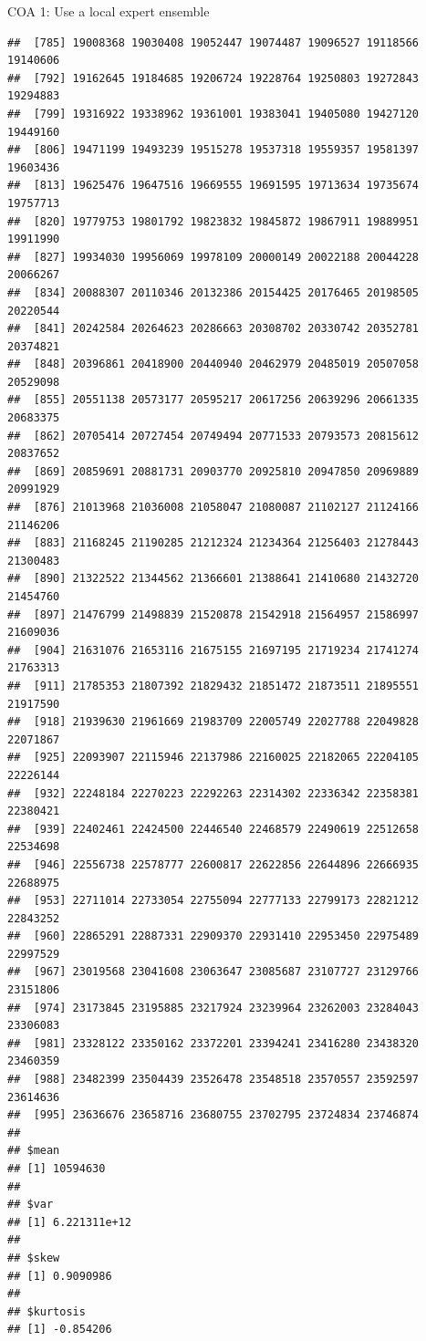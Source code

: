\documentclass[ignorenonframetext,]{beamer}
\begin{document}
\begin{frame}[fragile]{COA 1: Use a local expert ensemble}
\begin{verbatim}
##  [785] 19008368 19030408 19052447 19074487 19096527 19118566 19140606
##  [792] 19162645 19184685 19206724 19228764 19250803 19272843 19294883
##  [799] 19316922 19338962 19361001 19383041 19405080 19427120 19449160
##  [806] 19471199 19493239 19515278 19537318 19559357 19581397 19603436
##  [813] 19625476 19647516 19669555 19691595 19713634 19735674 19757713
##  [820] 19779753 19801792 19823832 19845872 19867911 19889951 19911990
##  [827] 19934030 19956069 19978109 20000149 20022188 20044228 20066267
##  [834] 20088307 20110346 20132386 20154425 20176465 20198505 20220544
##  [841] 20242584 20264623 20286663 20308702 20330742 20352781 20374821
##  [848] 20396861 20418900 20440940 20462979 20485019 20507058 20529098
##  [855] 20551138 20573177 20595217 20617256 20639296 20661335 20683375
##  [862] 20705414 20727454 20749494 20771533 20793573 20815612 20837652
##  [869] 20859691 20881731 20903770 20925810 20947850 20969889 20991929
##  [876] 21013968 21036008 21058047 21080087 21102127 21124166 21146206
##  [883] 21168245 21190285 21212324 21234364 21256403 21278443 21300483
##  [890] 21322522 21344562 21366601 21388641 21410680 21432720 21454760
##  [897] 21476799 21498839 21520878 21542918 21564957 21586997 21609036
##  [904] 21631076 21653116 21675155 21697195 21719234 21741274 21763313
##  [911] 21785353 21807392 21829432 21851472 21873511 21895551 21917590
##  [918] 21939630 21961669 21983709 22005749 22027788 22049828 22071867
##  [925] 22093907 22115946 22137986 22160025 22182065 22204105 22226144
##  [932] 22248184 22270223 22292263 22314302 22336342 22358381 22380421
##  [939] 22402461 22424500 22446540 22468579 22490619 22512658 22534698
##  [946] 22556738 22578777 22600817 22622856 22644896 22666935 22688975
##  [953] 22711014 22733054 22755094 22777133 22799173 22821212 22843252
##  [960] 22865291 22887331 22909370 22931410 22953450 22975489 22997529
##  [967] 23019568 23041608 23063647 23085687 23107727 23129766 23151806
##  [974] 23173845 23195885 23217924 23239964 23262003 23284043 23306083
##  [981] 23328122 23350162 23372201 23394241 23416280 23438320 23460359
##  [988] 23482399 23504439 23526478 23548518 23570557 23592597 23614636
##  [995] 23636676 23658716 23680755 23702795 23724834 23746874
## 
## $mean
## [1] 10594630
## 
## $var
## [1] 6.221311e+12
## 
## $skew
## [1] 0.9090986
## 
## $kurtosis
## [1] -0.854206
\end{verbatim}

\end{frame}
\end{document}
